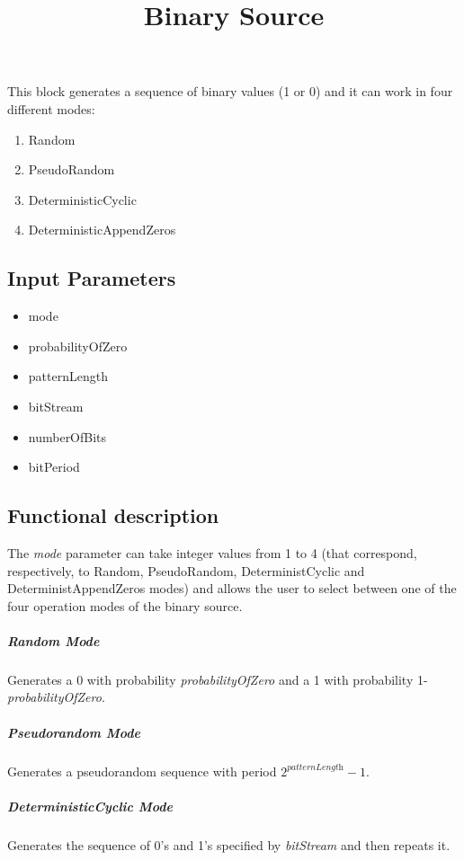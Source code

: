 \documentclass[a4paper]{article}
\title{Binary Source}
\begin{document}
\maketitle
This block generates a sequence of binary values (1 or 0) and it can work in four different modes: 

\begin{multicols}{2}
\begin{enumerate}
	\item Random
	\item PseudoRandom 
	\item DeterministicCyclic 
	\item DeterministicAppendZeros 
\end{enumerate}
\end{multicols}

\subsection*{Input Parameters}

\begin{multicols}{2}
	\begin{itemize}
		\item mode
		\item probabilityOfZero 
		\item patternLength 
		\item bitStream 
		\item numberOfBits 
		\item bitPeriod 
	\end{itemize}
\end{multicols}

\subsection*{Functional description}

The \textit{mode} parameter can take integer values from 1 to 4 (that correspond, respectively, to Random, PseudoRandom, DeterministCyclic and DeterministAppendZeros modes) and allows the user to select between one of the four operation modes of the binary source.

\subparagraph*{Random Mode}
Generates a 0 with probability \textit{probabilityOfZero} and a 1 with probability 1-\textit{probabilityOfZero}.

\subparagraph*{Pseudorandom Mode} 
Generates a pseudorandom sequence with period $2^\textit{patternLength}-1$.

\subparagraph*{DeterministicCyclic Mode}
Generates the sequence of 0's and 1's specified by \textit{bitStream} and then repeats it.
\end{document}
